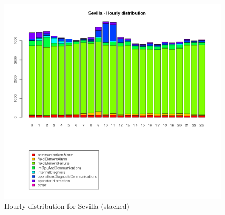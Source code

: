 \documentclass[a4paper,12pt]{article}
\begin{document}
\begin{figure}[htb]
 \centering
 \includegraphics[width=\textwidth]{./img/sevilla_timeline.png}
 \caption{Hourly distribution for Sevilla (stacked)} \label{fig:sevilla_timeline}
\end{figure}

\clearpage



\clearpage


 

\end{document}
